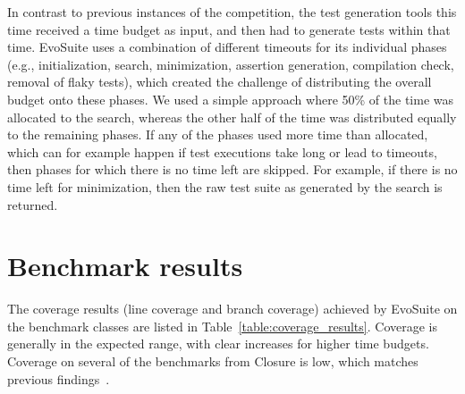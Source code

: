 \documentclass[10pt,conference,compsocconf]{IEEEtran}
\newcommand{\EVOSUITE}{{\sc EvoSuite}\xspace}
\begin{document}
In contrast to previous instances of the competition, the test
generation tools this time received a time budget as input, and then
had to generate tests within that time. \EVOSUITE uses a combination
of different timeouts for its individual phases (e.g., initialization,
search, minimization, assertion generation, compilation check, removal
of flaky tests), which created the challenge of distributing the
overall budget onto these phases. We used a simple approach where 50\%
of the time was allocated to the search, whereas the other half of the
time was distributed equally to the remaining phases. If any of the
phases used more time than allocated, which can for example happen if
test executions take long or lead to timeouts, then phases for which
there is no time left are skipped. For example, if there is no time
left for minimization, then the raw test suite as generated by the
search is returned.

\section{Benchmark results}

% 

\begin{table*}[t]
  \centering
  \caption{\label{table:coverage_results}Detailed coverage results of \EVOSUITE on the SBST benchmark classes.}
\resizebox{0.9\textwidth}{!}{  

}
\end{table*}

\begin{table*}[t]
  \centering
  \caption{\label{table:fault_results}Detailed fault detection results of \EVOSUITE on the SBST benchmark classes.}
\resizebox{0.9\textwidth}{!}{  

}	
\end{table*}



The coverage results (line coverage and branch coverage) achieved by
\EVOSUITE on the benchmark classes are listed in
Table~\ref{table:coverage_results}. Coverage is generally in the
expected range, with clear increases for higher time budgets. Coverage
on several of the benchmarks from Closure is low, which matches
previous findings~\cite{shamshiri2015automatically}. 
\end{document}
